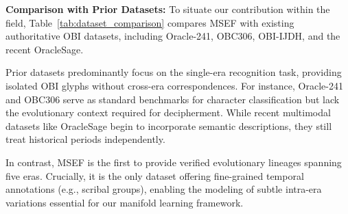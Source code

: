 \documentclass{article}
\begin{document}
\textbf{Comparison with Prior Datasets:} To situate our contribution within the field, Table~\ref{tab:dataset_comparison} compares MSEF with existing authoritative OBI datasets, including Oracle-241, OBC306, OBI-IJDH, and the recent OracleSage.

Prior datasets predominantly focus on the single-era recognition task, providing isolated OBI glyphs without cross-era correspondences. For instance, Oracle-241 and OBC306 serve as standard benchmarks for character classification but lack the evolutionary context required for decipherment. While recent multimodal datasets like OracleSage begin to incorporate semantic descriptions, they still treat historical periods independently.

In contrast, MSEF is the first to provide verified evolutionary lineages spanning five eras. Crucially, it is the only dataset offering fine-grained temporal annotations (e.g., scribal groups), enabling the modeling of subtle intra-era variations essential for our manifold learning framework.

\begin{table}[t]
\centering
\caption{\textbf{Comparison of MSEF with Existing OBI Datasets.} MSEF is the first unified dataset to support cross-era decipherment with fine-grained evolutionary lineages. ($\bullet$: Fully Supported, $\circ$: Partially/Not Supported)}
\label{tab:dataset_comparison}
\vspace{-10pt}
\end{table}
\end{document}
